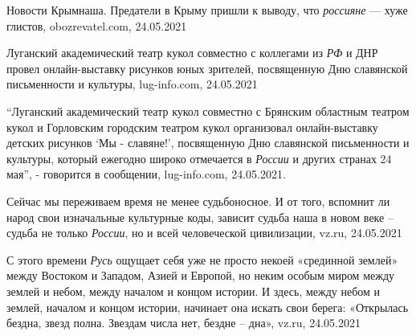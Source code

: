  
 
 
 
 
Новости Крымнаша. Предатели в Крыму пришли к выводу, что \emph{россияне} — хуже
глистов, obozrevatel.com, 24.05.2021

Луганский академический театр кукол совместно с коллегами из \emph{РФ} и ДНР
провел онлайн-выставку рисунков юных зрителей, посвященную Дню славянской
письменности и культуры, lug-info.com, 24.05.2021

\enquote{Луганский академический театр кукол совместно с Брянским областным театром
кукол и Горловским городским театром кукол организовал онлайн-выставку детских
рисунков \enquote{Мы - славяне!}, посвященную Дню славянской письменности и культуры,
который ежегодно широко отмечается в \emph{России} и других странах 24 мая}, -
говорится в сообщении, lug-info.com, 24.05.2021.

Сейчас мы переживаем время не менее судьбоносное. И от того, вспомнит ли народ
свои изначальные культурные коды, зависит судьба наша в новом веке – судьба не
только \emph{России}, но и всей человеческой цивилизации, vz.ru, 24.05.2021

С этого времени \emph{Русь} ощущает себя уже не просто некоей «срединной землей» между
Востоком и Западом, Азией и Европой, но неким особым миром между землей и
небом, между началом и концом истории. И здесь, между небом и землей, началом и
концом истории, начинает она искать свои берега: «Открылась бездна, звезд
полна. Звездам числа нет, бездне – дна», vz.ru, 24.05.2021
